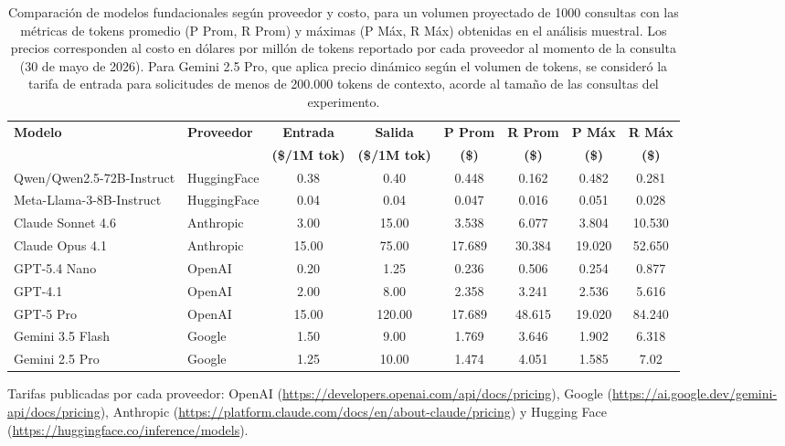 \begin{table}[ht]
\begin{adjustwidth}{-1.75cm}{-1.75cm}
\centering
\begin{threeparttable}
\caption{Comparación de modelos fundacionales según proveedor y costo, para un volumen proyectado de 1000 consultas con las métricas de tokens promedio (P Prom, R Prom) y máximas (P Máx, R Máx) obtenidas en el análisis muestral. Los precios corresponden al costo en dólares por millón de tokens reportado por cada proveedor al momento de la consulta (30 de mayo de 2026). Para Gemini 2.5 Pro, que aplica precio dinámico según el volumen de tokens, se consideró la tarifa de entrada para solicitudes de menos de 200.000 tokens de contexto, acorde al tamaño de las consultas del experimento.}
\label{6-Precios-Tabla}

\footnotesize
\begin{tabular}{l l c c c c c c}
\toprule
\textbf{Modelo} &
\textbf{Proveedor} &
\textbf{Entrada} &
\textbf{Salida} &
\textbf{P Prom} &
\textbf{R Prom} &
\textbf{P Máx} &
\textbf{R Máx} \\
 &
 &
\textbf{(\$/1M tok)} &
\textbf{(\$/1M tok)} &
\textbf{(\$)} &
\textbf{(\$)} &
\textbf{(\$)} &
\textbf{(\$)} \\
\midrule

Qwen/Qwen2.5-72B-Instruct & HuggingFace & 0.38 & 0.40 & 0.448 & 0.162 & 0.482 & 0.281 \\
Meta-Llama-3-8B-Instruct & HuggingFace & 0.04 & 0.04 & 0.047 & 0.016 & 0.051 & 0.028 \\
Claude Sonnet 4.6 & Anthropic & 3.00 & 15.00 & 3.538 & 6.077 & 3.804 & 10.530 \\
Claude Opus 4.1 & Anthropic & 15.00 & 75.00 & 17.689 & 30.384 & 19.020 & 52.650 \\
GPT-5.4 Nano & OpenAI & 0.20 & 1.25 & 0.236 & 0.506 & 0.254 & 0.877 \\
GPT-4.1 & OpenAI & 2.00 & 8.00 & 2.358 & 3.241 & 2.536 & 5.616 \\
GPT-5 Pro & OpenAI & 15.00 & 120.00 & 17.689 & 48.615 & 19.020 & 84.240 \\
Gemini 3.5 Flash & Google & 1.50 & 9.00 & 1.769 & 3.646 & 1.902 & 6.318 \\
Gemini 2.5 Pro & Google & 1.25 & 10.00 & 1.474 & 4.051 & 1.585 & 7.02 \\

\bottomrule
\end{tabular}
\begin{tablenotes}
\footnotesize
\item Tarifas publicadas por cada proveedor: OpenAI (\url{https://developers.openai.com/api/docs/pricing}), Google (\url{https://ai.google.dev/gemini-api/docs/pricing}), Anthropic (\url{https://platform.claude.com/docs/en/about-claude/pricing}) y Hugging Face (\url{https://huggingface.co/inference/models}).
\end{tablenotes}
\end{threeparttable}
\end{adjustwidth}
\end{table}

